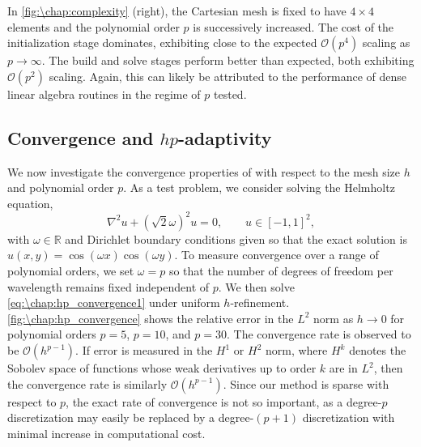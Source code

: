 In \cref{fig:\chap:complexity} (right), the Cartesian mesh is fixed to have $4 \times 4$ elements and the polynomial order $p$ is successively increased. The cost of the initialization stage dominates, exhibiting close to the expected $\mathcal{O}(p^4)$ scaling as $p \to \infty$. The build and solve stages perform better than expected, both exhibiting $\mathcal{O}(p^2)$ scaling. Again, this can likely be attributed to the performance of dense linear algebra routines in the regime of $p$ tested.

\subsection{Convergence and $hp$-adaptivity}
We now investigate the convergence properties of \ultraSEM with respect to the mesh size $h$ and polynomial order $p$. As a test problem, we consider solving the Helmholtz equation,
\begin{equation}\label{eq:\chap:hp_convergence1}
\nabla^2 u + (\sqrt{2} \omega)^2 u = 0, \qquad u \in [-1,1]^2,
\end{equation}
with $\omega \in \mathbb{R}$ and Dirichlet boundary conditions given so that the exact solution is $u(x,y) = \cos(\omega x) \cos(\omega y)$. To measure convergence over a range of polynomial orders, we set $\omega = p$ so that the number of degrees of freedom per wavelength remains fixed independent of $p$. We then solve \cref{eq:\chap:hp_convergence1} under uniform $h$-refinement. \cref{fig:\chap:hp_convergence} shows the relative error in the $L^2$ norm as $h \to 0$ for polynomial orders $p=5$, $p=10$, and $p=30$. The convergence rate is observed to be $\mathcal{O}(h^{p-1})$. If error is measured in the $H^1$ or $H^2$ norm, where $H^k$ denotes the Sobolev space of functions whose weak derivatives up to order $k$ are in $L^2$, then the convergence rate is similarly $\mathcal{O}(h^{p-1})$. Since our method is sparse with respect to $p$, the exact rate of convergence is not so important, as a degree-$p$ discretization may easily be replaced by a degree-$(p+1)$ discretization with minimal increase in computational cost.

